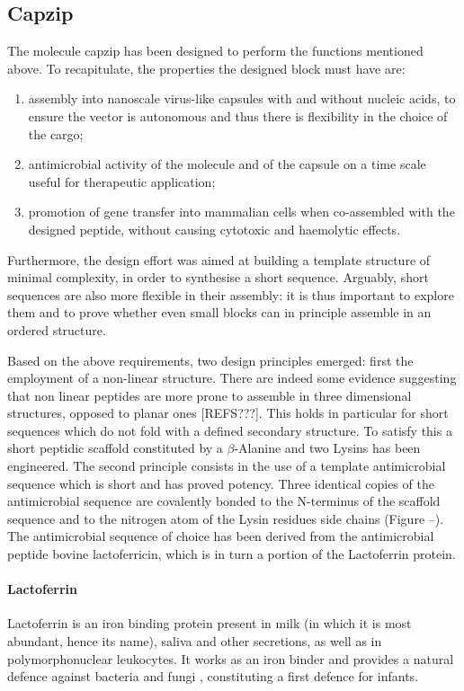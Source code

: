\subsection{Capzip}
The molecule capzip has been designed to perform the functions mentioned above. To recapitulate, the properties the designed block must have are:
\begin{enumerate}
\item assembly into nanoscale virus-like capsules with and without nucleic acids, to ensure the vector is autonomous and thus there is flexibility in the choice of the cargo;
\item antimicrobial activity of the molecule and of the capsule on a time scale useful for therapeutic application;
\item promotion of gene transfer into mammalian cells when co-assembled with the designed peptide, without causing cytotoxic and haemolytic effects.
\end{enumerate}
%
Furthermore, the design effort was aimed at building a template structure of minimal complexity, in order to synthesise a short sequence. Arguably, short sequences are also more flexible in their assembly: it is thus important to explore them and to prove whether even small blocks can in principle assemble in an ordered structure.

Based on the above requirements, two design principles emerged: first the employment of a non-linear structure. There are indeed some evidence suggesting that non linear peptides are more prone to assemble in three dimensional structures, opposed to planar ones [REFS???]. This holds in particular for short sequences which do not fold with a defined secondary structure.
%
To satisfy this a short peptidic scaffold constituted by a $\beta$-Alanine and two Lysins has been engineered.
%
The second principle consists in the use of a template antimicrobial sequence which is short and has proved potency.
%
Three identical copies of the antimicrobial sequence are covalently bonded to the N-terminus of the scaffold sequence and to the nitrogen atom of the Lysin residues side chains (Figure --).
%
The antimicrobial sequence of choice has been derived from the antimicrobial peptide bovine lactoferricin, which is in turn a portion of the Lactoferrin protein.

\paragraph{Lactoferrin} Lactoferrin is an iron binding protein present in milk (in which it is most abundant, hence its name), saliva and other secretions, as well as in polymorphonuclear leukocytes.
%
It works as an iron binder and provides a natural defence against bacteria and fungi \cite{Sanchez1992,Arnol1977,Arnold1980,Kirkpatrick1971,Jahani2015}, constituting a first defence for infants.

